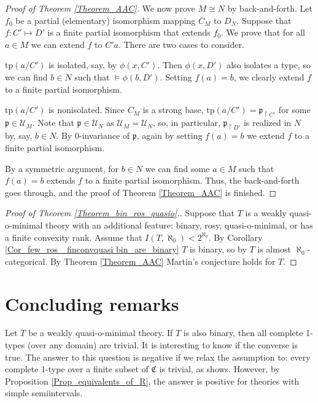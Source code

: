 \documentclass{amsart}
\theoremstyle{definition}
\theoremstyle{definition}
\def\strok{\restriction}
\newcommand{\Mon}{\mathfrak C}
\newcommand{\tp}{\mathrm{tp}}
\begin{document}
\begin{proof}[Proof of Theorem \ref{Theorem_AAC}]
    We now prove $M\cong N$ by back-and-forth. Let $f_0$ be a partial (elementary) isomorphism mapping $C_M$ to $D_N$. Suppose that $f:C'\mapsto D'$ is a finite partial isomorphism that extends $f_0$. We prove that for all $a\in M$ we can extend $f$ to $C'a$. There are two cases to consider. 

    \smallskip{} $\tp(a/C')$ is isolated, say, by  $\phi(x,C')$. Then $\phi(x,D')$ also isolates a type, so we can find $b\in N$ such that $\models\phi(b,D')$. Setting $f(a)=b$, we clearly extend $f$ to a finite partial isomorphism.

    \smallskip{} $\tp(a/C')$ is nonisolated. Since $C_M$ is a strong base, $\tp(a/C')=\mathfrak p_{\strok C'}$ for some $\mathfrak p\in\mathcal U_M$. Note that $\mathfrak p\in\mathcal U_N$ as $\mathcal U_M=\mathcal U_N$, so, in particular, $\mathfrak p_{\strok D'}$ is realized in $N$ by, say, $b\in N$. By $0$-invariance of $\mathfrak p$, again by setting $f(a)=b$ we extend $f$ to a finite partial isomorphism.

\smallskip
    By a symmetric argument, for $b\in N$ we can find some $a\in M$ such that $f(a)=b$ extends $f$ to a finite partial isomorphism. Thus, the back-and-forth goes through, and the proof of Theorem \ref{Theorem_AAC} is finished. 
\end{proof}

\begin{proof}[{\it Proof of Theorem \ref{Theorem_bin_ros_quasio}.}]
Suppose that $T$ is a weakly quasi-o-minimal theory with an additional feature: binary, rosy, quasi-o-minimal, or has a finite convexity rank. Assume that $I(T,\aleph_0)<2^{\aleph_0}$. By Corollary \ref{Cor_few_ros_ finconvquasi bin_are_binary} $T$ is binary, so by \cite[Lemma 8.1] {MT} $T$ is almost $\aleph_0$-categorical. By Theorem \ref{Theorem_AAC} Martin's conjecture holds for $T$.
\end{proof}

 

 
\section{Concluding remarks}\label{Section 7}


Let $T$ be a weakly quasi-o-minimal theory. 
If $T$ is also binary, then all complete 1-types (over any domain) are trivial. It is interesting to know if the converse is true. The answer to this question is negative if we relax the assumption to: every complete 1-type over a finite subset of $\Mon$ is trivial, as \cite[Example 7.11]{MTwqom1} shows.
However, by Proposition \ref{Prop_equivalents_of_R}, the answer is positive for theories with simple semiintervals. 
\end{document}
